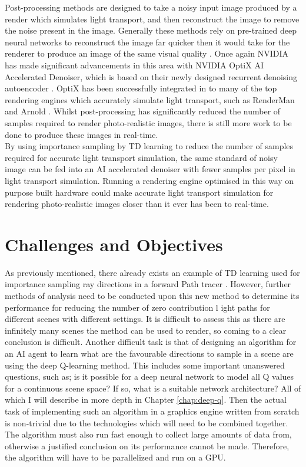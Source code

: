 \documentclass[../dissertation.tex]{subfiles}
\begin{document}
Post-processing methods are designed to take a noisy input image produced by a 
render which simulates light transport, and then reconstruct the image to remove 
the noise present in the image. Generally these methods rely on pre-trained deep 
neural networks to reconstruct the image far quicker then it would take for the 
renderer to produce an image of the same visual quality \cite{bako2017kernel}. 
Once again NVIDIA has made significant advancements in this area with NVIDIA 
OptiX AI Accelerated Denoiser, which is based on their newly designed recurrent 
denoising autoencoder \cite{chaitanya2017interactive}. OptiX has been successfully 
integrated in to many of the top rendering engines which accurately simulate light
transport, such as RenderMan \cite{christensen2018renderman} and Arnold 
\cite{georgiev2018arnold}. Whilst post-processing has significantly reduced the 
number of samples required to render photo-realistic images, there is still more 
work to be done to produce these images in real-time.\\

By using importance sampling by TD learning to reduce the number of samples 
required for accurate light transport simulation, the same standard of noisy 
image can be fed into an AI accelerated denoiser with fewer samples per pixel 
in light transport simulation. Running a rendering engine optimised in this way on 
purpose built hardware could make accurate light transport simulation for 
rendering photo-realistic images closer than it ever has been to real-time.

\section{Challenges and Objectives}


As previously mentioned, there already exists an example of TD learning used 
for importance sampling ray directions in a forward Path tracer \cite{dahm2017learning}. 
However, further methods of analysis need to be conducted upon this new 
method to determine its performance for reducing the number of zero contribution l
ight paths for different scenes with different settings. It is difficult to assess this as 
there are infinitely many scenes the method can be used to render, so coming to a 
clear conclusion is difficult. Another difficult task is that of designing an algorithm 
for an AI agent to learn what are the favourable directions to sample in a scene are 
using the deep Q-learning method. This includes some important unanswered 
questions, such as; is it possible for a deep neural network to model all Q values for 
a continuous scene space? If so, what is a suitable network architecture? All of 
which I will describe in more depth in Chapter \ref{chap:deep-q}. Then the actual 
task of implementing such an algorithm in a graphics engine written from scratch 
is non-trivial due to the technologies which will need to be combined together. 
The algorithm must also run fast enough to collect large amounts of data from, 
otherwise a justified conclusion on its performance cannot be made. Therefore, 
the algorithm will have to be parallelized and run on a GPU.\\
\end{document}
